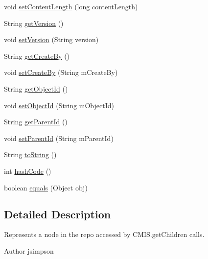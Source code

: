 \begin{DoxyCompactItemize}
\item 
void \hyperlink{classcom_1_1zia_1_1freshdocs_1_1model_1_1_node_ref_a850272f76fcf62c7fd63875300bbf89f}{set\-Content\-Length} (long content\-Length)
\item 
String \hyperlink{classcom_1_1zia_1_1freshdocs_1_1model_1_1_node_ref_af84f7f58e2277948c0ae327dcc86c44b}{get\-Version} ()
\item 
void \hyperlink{classcom_1_1zia_1_1freshdocs_1_1model_1_1_node_ref_a3aa29e6d2e1f4b11006ab084fe412753}{set\-Version} (String version)
\item 
String \hyperlink{classcom_1_1zia_1_1freshdocs_1_1model_1_1_node_ref_aadb2fd54bedfdfb3228070ece0b7e9c2}{get\-Create\-By} ()
\item 
void \hyperlink{classcom_1_1zia_1_1freshdocs_1_1model_1_1_node_ref_a0259ca8f6e68d3c27edfc232e147f3c8}{set\-Create\-By} (String m\-Create\-By)
\item 
String \hyperlink{classcom_1_1zia_1_1freshdocs_1_1model_1_1_node_ref_af18f06e8c36bbee6fdf078e9168c47d6}{get\-Object\-Id} ()
\item 
void \hyperlink{classcom_1_1zia_1_1freshdocs_1_1model_1_1_node_ref_a49b62601b7d6cb0f4bacb02dce1d0043}{set\-Object\-Id} (String m\-Object\-Id)
\item 
String \hyperlink{classcom_1_1zia_1_1freshdocs_1_1model_1_1_node_ref_a72186112b53016b52d81256595fa8f76}{get\-Parent\-Id} ()
\item 
void \hyperlink{classcom_1_1zia_1_1freshdocs_1_1model_1_1_node_ref_a2d53f1ee7f74dd7581b32cad7b3b9e9a}{set\-Parent\-Id} (String m\-Parent\-Id)
\item 
String \hyperlink{classcom_1_1zia_1_1freshdocs_1_1model_1_1_node_ref_ae8ba0c8a6ed594d7970301967d6bbd21}{to\-String} ()
\item 
int \hyperlink{classcom_1_1zia_1_1freshdocs_1_1model_1_1_node_ref_a85cac837c237263c5eefa3374c8b5450}{hash\-Code} ()
\item 
boolean \hyperlink{classcom_1_1zia_1_1freshdocs_1_1model_1_1_node_ref_a9c14b0eee59022942074bfef9c2a021d}{equals} (Object obj)
\end{DoxyCompactItemize}


\subsection{Detailed Description}
Represents a node in the repo accessed by C\-M\-I\-S.\-get\-Children calls. \begin{DoxyAuthor}{Author}
jsimpson 
\end{DoxyAuthor}


